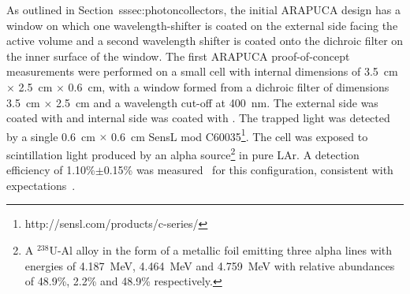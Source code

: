 As outlined in Section~{sssec:photoncollectors}, the initial ARAPUCA design has a window on which one wavelength-shifter is coated on the external side facing the \lar active volume and a second wavelength shifter is coated onto the dichroic filter on the inner surface of the window.  
The first ARAPUCA proof-of-concept measurements were performed on a small cell with internal dimensions of \SI{3.5}{cm} $\times$ \SI{2.5}{cm} $\times$ \SI{0.6}{cm}, with a window formed from a dichroic filter of  dimensions \SI{3.5}{cm} $\times$ \SI{2.5}{cm} and a wavelength cut-off at \SI{400}{nm}. The external side was coated with  and internal side was coated with . 
The trapped light was detected by a single \SI{0.6}{cm} $\times$ \SI{0.6}{cm} SensL  mod C60035\footnote{http://sensl.com/products/c-series/}. The cell was exposed to scintillation light produced by an alpha source\footnote{A $^{238}$U-Al alloy in the form of a metallic foil emitting three alpha lines with energies of  \SI{4.187}{MeV}, \SI{4.464}{MeV} and  \SI{4.759}{MeV} with relative abundances of 48.9\%, 2.2\% and 48.9\% respectively.} in pure LAr. A detection efficiency of 1.10\%$\pm$0.15\% was measured~\cite{Segreto:2018jdx} for this configuration, consistent with  expectations~\cite{Marinho:2018doi}. 



